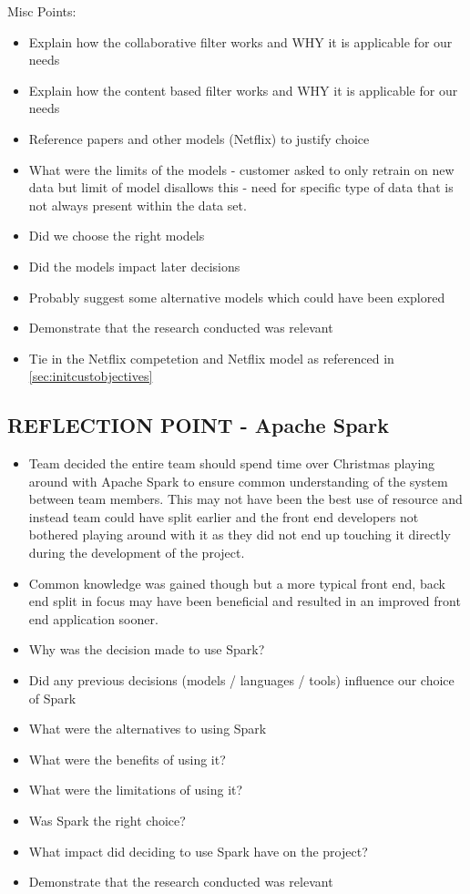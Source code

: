 \documentclass{l3proj}
\begin{document}
Misc Points:
\begin{itemize}
\item Explain how the collaborative filter works and WHY it is applicable for our needs
\item Explain how the content based filter works and WHY it is applicable for our needs
\item Reference papers and other models (Netflix) to justify choice
\item What were the limits of the models - customer asked to only retrain on new data but limit of model disallows this - need for specific type of data that is not always present within the data set.
\item Did we choose the right models
\item Did the models impact later decisions
\item Probably suggest some alternative models which could have been explored
\item Demonstrate that the research conducted was relevant
\item Tie in the Netflix competetion and Netflix model as referenced in \ref{sec:initcustobjectives}
\end{itemize}


\subsection{REFLECTION POINT - Apache Spark}
\label{sec:sparkreflection}

\begin{itemize}
\item Team decided the entire team should spend time over Christmas playing around with Apache Spark to ensure common understanding of the system between team members. This may not have been the best use of resource and instead team could have split earlier and the front end developers not bothered playing around with it as they did not end up touching it directly during the development of the project. 
\item Common knowledge was gained though but a more typical front end, back end split in focus may have been beneficial and resulted in an improved front end application sooner.
\item Why was the decision made to use Spark?
\item Did any previous decisions (models / languages / tools) influence our choice of Spark
\item What were the alternatives to using Spark
\item What were the benefits of using it?
\item What were the limitations of using it?
\item Was Spark the right choice?
\item What impact did deciding to use Spark have on the project?
\item Demonstrate that the research conducted was relevant
\end{itemize}
\end{document}
